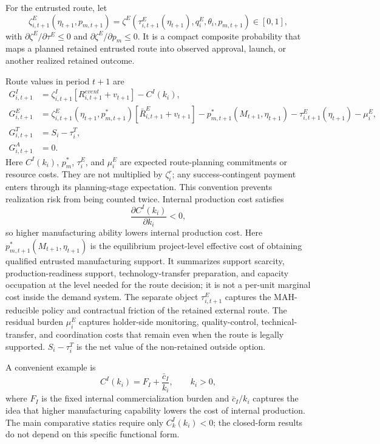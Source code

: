 \documentclass[12pt]{article}
\newcommand{\1}{\mathbf{1}}
\begin{document}
For the entrusted route, let
\begin{equation}
    \zeta^E_{i,t+1}(\eta_{t+1},p_{m,t+1})
    =
    \zeta^E\!\left(\tau^E_{i,t+1}(\eta_{t+1}),q_i^E,\theta_i,p_{m,t+1}\right)
    \in[0,1],
    \label{eq:zetaE}
\end{equation}
with $\partial\zeta^E/\partial\tau^E\le0$ and $\partial\zeta^E/\partial p_m\le0$. It is a compact composite probability that maps a planned retained entrusted route into observed approval, launch, or another realized retained outcome.

Route values in period $t+1$ are
\begin{align}
    G^I_{i,t+1}
    &=\zeta^I_{i,t+1}\left[R^{event}_{i,t+1}+v_{t+1}\right]-C^I(k_i),
    \label{eq:GI}\\
    G^E_{i,t+1} &=
    \zeta^E_{i,t+1}(\eta_{t+1},p^*_{m,t+1})
    \left[\bar R^E_{i,t+1}+v_{t+1}\right]
    -p^*_{m,t+1}(M_{t+1},\eta_{t+1})
    -\tau^E_{i,t+1}(\eta_{t+1})
    -\mu_i^E,\label{eq:GE}\\
    G^T_{i,t+1} &= S_i-\tau_i^T,\label{eq:GT}\\
    G^A_{i,t+1} &=0.\label{eq:GA}
\end{align}
Here $C^I(k_i)$, $p_m^*$, $\tau_i^E$, and $\mu_i^E$ are expected route-planning commitments or resource costs. They are not multiplied by $\zeta_i^r$; any success-contingent payment enters through its planning-stage expectation. This convention prevents realization risk from being counted twice. Internal production cost satisfies
\begin{equation}
    \frac{\partial C^I(k_i)}{\partial k_i}<0,
    \label{eq:CIderiv}
\end{equation}
so higher manufacturing ability lowers internal production cost. Here $p^*_{m,t+1}(M_{t+1},\eta_{t+1})$ is the equilibrium project-level effective cost of obtaining qualified entrusted manufacturing support. It summarizes support scarcity, production-readiness support, technology-transfer preparation, and capacity occupation at the level needed for the route decision; it is not a per-unit marginal cost inside the demand system. The separate object $\tau^E_{i,t+1}$ captures the MAH-reducible policy and contractual friction of the retained external route. The residual burden $\mu_i^E$ captures holder-side monitoring, quality-control, technical-transfer, and coordination costs that remain even when the route is legally supported. $S_i-\tau_i^T$ is the net value of the non-retained outside option.

A convenient example is
\begin{equation}
    C^I(k_i)=F_I+\frac{\bar c_I}{k_i},
    \qquad k_i>0,
    \label{eq:CI_example}
\end{equation}
where $F_I$ is the fixed internal commercialization burden and $\bar c_I/k_i$ captures the idea that higher manufacturing capability lowers the cost of internal production. The main comparative statics require only $C_k^I(k_i)<0$; the closed-form results do not depend on this specific functional form.
\end{document}
